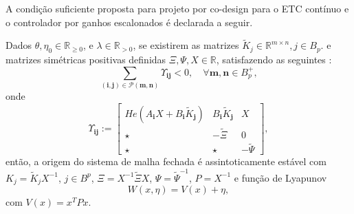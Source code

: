 A condição suficiente proposta para projeto por co-design para o ETC contínuo  e o controlador por ganhos escalonados é declarada a seguir.
\begin{theorem}
  \label{theorem:constraints-2}
  Dados $\theta, \eta_0 \in \mathbb{R}_{\geq 0}$, e $\lambda \in \mathbb{R}_{> 0}$, se existirem as matrizes $\tilde{K}_j \in \mathbb{R}^{m \times n}, j \in B_p$. e matrizes simétricas positivas definidas $\Xi, \Psi, X \in \mathbb{R}$, satisfazendo as seguintes :
  \begin{equation}
    \sum_{(\mathbf{i}, \mathbf{j}) \in \mathscr{P} (\mathbf{m},\mathbf{n})} \Upsilon_{\mathbf{ij}} < 0, \quad \forall \mathbf{m}, \mathbf{n} \in B_p^+,
    \label{eq:constraints_1}
  \end{equation}
  onde
  \begin{equation}
    \Upsilon_{\mathbf{ij}} :=
    \begin{bmatrix}
      He(A_\mathbf{i}X +B_\mathbf{i}\tilde{K}_\mathbf{j}) & B_\mathbf{i}\tilde{K}_{\mathbf{j}} & X             \\
      \star                                               & -\tilde{\Xi}                       & 0             \\
      \star                                               & \star                              & -\tilde{\Psi}
    \end{bmatrix},
  \end{equation}
  então, a origem do sistema de malha fechada é assintoticamente estável com $K_j = \tilde{K}_jX^{-1}$, $j \in B^p$, $\Xi= X^{-1}\tilde{\Xi}X$, $\Psi = \tilde{\Psi}^{-1}$, $P = X^{-1}$ e função de Lyapunov
  \begin{equation}
    W(x, \eta) = V(x) + \eta,
  \end{equation}
  com $V(x)=x^TPx$.
\end{theorem}

